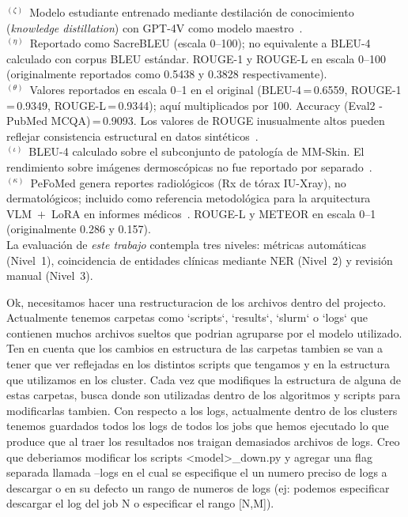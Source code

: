 \begin{table}[htbp]
{\begin{tabular}{@{}lllrrrrrl@{}}
\bottomrule
\end{tabular}%
}
\vspace{4pt}
\begin{minipage}{\textwidth}
  \footnotesize
  $^{(\zeta)}$~Modelo estudiante entrenado mediante destilación de conocimiento
  (\textit{knowledge distillation}) con GPT-4V como modelo maestro~\cite{AutomatedReport2025}.\\
  $^{(\eta)}$~Reportado como SacreBLEU (escala 0--100); no equivalente a BLEU-4
  calculado con corpus BLEU estándar. ROUGE-1 y ROUGE-L en escala 0--100
  (originalmente reportados como 0.5438 y 0.3828 respectivamente).\\
  $^{(\theta)}$~Valores reportados en escala 0--1 en el original
  (BLEU-4\,=\,0.6559, ROUGE-1\,=\,0.9349, ROUGE-L\,=\,0.9344);
  aquí multiplicados por 100. Accuracy (Eval2 - PubMed MCQA)\,=\,0.9093.
  Los valores de ROUGE inusualmente altos pueden reflejar consistencia
  estructural en datos sintéticos~\cite{DermatoLlama2025}.\\
  $^{(\iota)}$~BLEU-4 calculado sobre el subconjunto de patología de MM-Skin.
  El rendimiento sobre imágenes dermoscópicas no fue reportado por separado~\cite{MMSkin2025}.\\
  $^{(\kappa)}$~PeFoMed genera reportes radiológicos (Rx de tórax IU-Xray),
  no dermatológicos; incluido como referencia metodológica para
  la arquitectura VLM~$+$~LoRA en informes médicos~\cite{PeFoMed2024}.
  ROUGE-L y METEOR en escala 0--1 (originalmente 0.286 y 0.157).\\
  La evaluación de \textit{este trabajo} contempla tres niveles:
  métricas automáticas (Nivel~1), coincidencia de entidades clínicas
  mediante NER (Nivel~2) y revisión manual (Nivel~3).
\end{minipage}
\end{table}
Ok, necesitamos hacer una restructuracion de los archivos dentro del projecto. Actualmente tenemos carpetas como `scripts`, `results`, `slurm` o `logs` que contienen muchos archivos sueltos que podrian agruparse por el modelo utilizado. Ten en cuenta que los cambios en estructura de las carpetas tambien se van a tener que ver reflejadas en los distintos scripts que tengamos y en la estructura que utilizamos en los cluster. Cada vez que modifiques la estructura de alguna de estas carpetas, busca donde son utilizadas dentro de los algoritmos y scripts para modificarlas tambien. Con respecto a los logs, actualmente dentro de los clusters tenemos guardados todos los logs de todos los jobs que hemos ejecutado lo que produce que al traer los resultados nos traigan demasiados archivos de logs. Creo que deberiamos modificar los scripts <model>_down.py y agregar una flag separada llamada --logs en el cual se especifique el un numero preciso de logs a descargar o en su defecto un rango de numeros de logs (ej: podemos especificar descargar el log del job N o especificar el rango [N,M]).